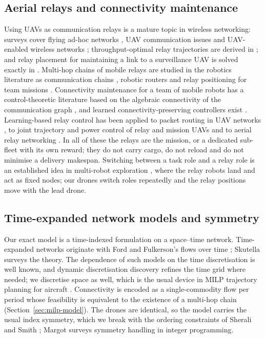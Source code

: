 \documentclass[final,5p,times,twocolumn]{elsarticle}
\begin{document}
\subsection{Aerial relays and connectivity maintenance}
\label{sec:rel-relay}
Using UAVs as communication relays is a mature topic in wireless networking: surveys cover flying
ad-hoc networks \cite{bekmezci2013}, UAV communication issues \cite{gupta2016} and UAV-enabled
wireless networks \cite{mozaffari2019}; throughput-optimal relay trajectories are derived in
\cite{zeng2016}; and relay placement for maintaining a link to a surveillance UAV is solved
exactly in \cite{burdakov2010}. Multi-hop chains of mobile relays are studied in the robotics
literature as communication chains \cite{dixon2009}, robotic routers \cite{tekdas2010} and
relay positioning for team missions \cite{yanmaz2022}. Connectivity maintenance for a team of
mobile robots has a control-theoretic literature based on the algebraic connectivity of the
communication graph \cite{zavlanos2007,zavlanos2011}, and learned connectivity-preserving
controllers exist \cite{li2021}. Learning-based relay control has been applied to packet routing
in UAV networks \cite{ding2022}, to joint trajectory and power control of relay and mission UAVs
\cite{mutto2024} and to aerial relay networking \cite{maen2024}. In all of these the relays are
the mission, or a dedicated sub-fleet with its own reward; they do not carry cargo, do not reload
and do not minimise a delivery makespan. Switching between a task role and a relay role is an
established idea in multi-robot exploration \cite{dehoog2009,cesare2015}, where the relay robots
land and act as fixed nodes; our drones switch roles repeatedly and the relay positions move with
the lead drone.

\subsection{Time-expanded network models and symmetry}
\label{sec:rel-tenet}
Our exact model is a time-indexed formulation on a space--time network. Time-expanded networks
originate with Ford and Fulkerson's flows over time \cite{ford1962}; Skutella \cite{skutella2009}
surveys the theory. The dependence of such models on the time discretisation is well known, and
dynamic discretisation discovery \cite{boland2017} refines the time grid where needed; we
discretise space as well, which is the usual device in MILP trajectory planning for aircraft
\cite{richards2002}. Connectivity is encoded as a single-commodity flow per period whose
feasibility is equivalent to the existence of a multi-hop chain (Section~\ref{sec:milp-model}).
The drones are identical, so the model carries the usual index symmetry, which we break with the
ordering constraints of Sherali and Smith \cite{sherali2001}; Margot \cite{margot2010} surveys
symmetry handling in integer programming.
\end{document}
